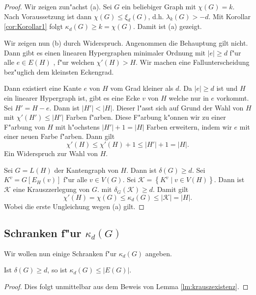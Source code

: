 \begin{proof}
  Wir zeigen zun"achst (a). Sei $G$ ein beliebiger Graph mit $\chi(G) = k$. Nach Voraussetzung ist dann $\chi(G) \leq \xi_{d}(G)$, d.h. $\lambda_{k}\left( G \right) > -d$. Mit Korollar \ref{cor:Korollar1} folgt $\kappa_{d}\left( G \right) \geq k = \chi\left( G \right)$. 
  Damit ist (a) gezeigt. 

  Wir zeigen nun (b) durch Widerspruch. Angenommen die Behauptung gilt nicht. Dann gibt es einen linearen Hypergraphen minimaler Ordnung mit $|e| \geq d$ f"ur alle $e\in E(H)$ , f"ur welchen $\chi'(H) > H$. 
  Wir machen eine Fallunterscheidung bez"uglich dem kleinsten Eckengrad.
  
   Dann existiert eine Kante $e$ von $H$ vom Grad kleiner als $d$. Da $|e| \geq d$ ist und $H$ ein linearer Hypergraph ist, gibt es eine Ecke $v$ von $H$ welche nur in $e$ vorkommt. Sei $H'= H-e$. Dann ist $|H'| < |H|$. Dieser l"asst sich auf Grund der Wahl von $H$ mit $\chi'(H') \leq |H'|$ Farben f"arben. Diese F"arbung k"onnen wir zu einer F"arbung von $H$ mit h"ochstens $|H'|+1 = |H|$ Farben erweitern, indem wir $e$ mit einer neuen Farbe f"arben. Dann gilt 
  $$\chi'(H) \leq \chi'(H) +1  \leq |H'| +1 = |H| .$$ 
  Ein Widerspruch zur Wahl von $H$. 

   Sei $G=L(H)$ der Kantengraph von $H$. Dann ist $\delta(G) \geq d$. Sei $K^{v} = G[E_{H}(v)]$ f"ur alle $v\in V(G)$. Sei $\mathcal{K}=\left\{ K^{v} \;|\; v \in V(H) \right\}$. Dann ist $\mathcal{K}$ eine Krauszzerlegung von $G$. mit $\delta_{G}(\mathcal{K}) \geq d$. Damit gilt
  \begin{equation*}
    \chi'(H) = \chi(G) \leq \kappa_{d}(G) \leq |\mathcal{K}| = |H|.
  \end{equation*}
  Wobei die erste Ungleichung wegen (a) gilt. 
\end{proof}


\subsection{Schranken f"ur $\kappa_d(G)$}

Wir wollen nun einige Schranken f"ur $\kappa_{d}(G)$ angeben. 
\begin{lemma}
  Ist $\delta(G) \geq d$, so ist $\kappa_{d}(G) \leq |E(G)|$. 
\end{lemma}
\begin{proof}
  Dies folgt unmittelbar aus dem Beweis von Lemma \ref{lm:krauszexistenz}. 
\end{proof}

